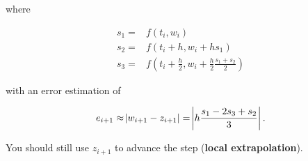 where

\begin{align*}
    s_1 = & f(t_i,w_i) \\
    s_2 = & f(t_i + h,w_i + hs_1) \\
    s_3 = & f(t_i + \frac{h}{2},w_i + \frac{h}{2}\frac{s_1 + s_2}{2})
\end{align*}

with an error estimation of

$$
e_{i+1} \approx \abs{w_{i+1} - z_{i+1}} = \abs{h\frac{s_1 - 2s_3 + s_2}{3}}.
$$

You should still use $z_{i+1}$ to advance the step (\textbf{local extrapolation}).